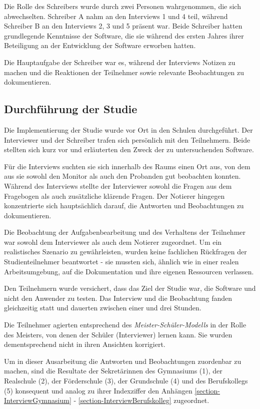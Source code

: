 Die Rolle des Schreibers wurde durch zwei Personen wahrgenommen, die sich abwechselten. Schreiber A nahm an den Interviews 1 und 4 teil, während Schreiber B an den Interviews 2, 3 und 5 präsent war. Beide Schreiber hatten grundlegende Kenntnisse der Software, die sie während des ersten Jahres ihrer Beteiligung an der Entwicklung der Software erworben hatten.

Die Hauptaufgabe der Schreiber war es, während der Interviews Notizen zu machen und die Reaktionen der Teilnehmer sowie relevante Beobachtungen zu dokumentieren. 

\subsection{Durchführung der Studie}

Die Implementierung der Studie wurde vor Ort in den Schulen durchgeführt. Der Interviewer und der Schreiber trafen sich persönlich mit den Teilnehmern. Beide stellten sich kurz vor und erläuterten den Zweck der zu untersuchenden Software.

Für die Interviews suchten sie sich innerhalb des Raums einen Ort aus, von dem aus sie sowohl den Monitor als auch den Probanden gut beobachten konnten. Während des Interviews stellte der Interviewer sowohl die Fragen aus dem Fragebogen als auch zusätzliche klärende Fragen. Der Notierer hingegen konzentrierte sich hauptsächlich darauf, die Antworten und Beobachtungen zu dokumentieren.

Die Beobachtung der Aufgabenbearbeitung und des Verhaltens der Teilnehmer war sowohl dem Interviewer als auch dem Notierer zugeordnet. Um ein realistisches Szenario zu gewährleisten, wurden keine fachlichen Rückfragen der Studienteilnehmer beantwortet - sie mussten sich, ähnlich wie in einer realen Arbeitsumgebung, auf die Dokumentation und ihre eigenen Ressourcen verlassen.

Den Teilnehmern wurde versichert, dass das Ziel der Studie war, die Software und nicht den Anwender zu testen. Das Interview und die Beobachtung fanden gleichzeitig statt und dauerten zwischen einer und drei Stunden.

Die Teilnehmer agierten entsprechend des \textit{Meister-Schüler-Modells} in der Rolle des Meisters, von denen der Schüler (Interviewer) lernen kann.\cite{Seibert-Giller,jacobsen} Sie wurden dementsprechend nicht in ihren Ansichten korrigiert.

Um in dieser Ausarbeitung die Antworten und Beobachtungen zuordenbar zu machen, sind die Resultate der Sekretärinnen des Gymnasiums (1), der Realschule (2), der Förderschule (3), der Grundschule (4) und des Berufskollegs (5) konsequent und analog zu ihrer Indexziffer den Anhängen \ref{section-InterviewGymnasium} - \ref{section-InterviewBerufskolleg} zugeordnet.

